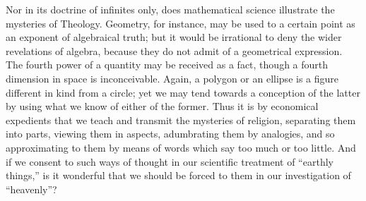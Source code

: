 Nor in its doctrine of infinites only, does
mathematical science illustrate the mysteries of Theology. Geometry,
for instance, may be used to a certain point as an exponent of
algebraical truth; but it would be irrational to deny the wider
revelations of algebra, because they do not admit of a geometrical
expression. The fourth power of a quantity may be received as a fact,
though a fourth dimension in space is inconceivable. Again, a polygon
or an ellipse is a figure different in kind from a circle; yet we may
tend towards a conception of the latter by using what we know of
either of the former. Thus it is by economical expedients that we
teach and transmit the mysteries of religion, separating them into
parts, viewing them in aspects, adumbrating them by analogies, and so
approximating to them by means of words which say too much or too
little. And if we consent to such ways of thought in our scientific
treatment of ``earthly things,'' is it wonderful that we should be
forced to them in our investigation of ``heavenly''?

